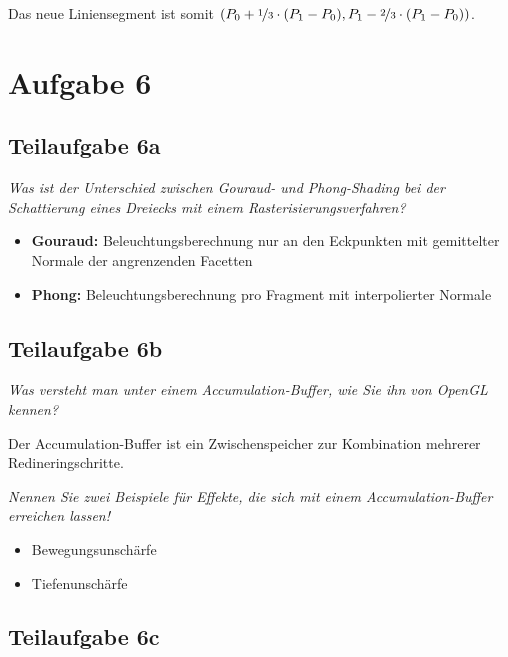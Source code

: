 \documentclass[a4paper]{scrartcl}
\begin{document}
Das neue Liniensegment ist somit $(P_0 + \nicefrac{1}{3} \cdot (P_1- P_0), P_1 - \nicefrac{2}{3} \cdot (P_1- P_0))$.

\section*{Aufgabe 6}
\subsection*{Teilaufgabe 6a}
\textit{Was ist der Unterschied zwischen Gouraud- und Phong-Shading bei der Schattierung eines Dreiecks mit einem Rasterisierungsverfahren?}

\begin{itemize}
	\item \textbf{Gouraud:} Beleuchtungsberechnung nur an den Eckpunkten mit gemittelter Normale der angrenzenden Facetten
	\item \textbf{Phong:} Beleuchtungsberechnung pro Fragment mit interpolierter Normale
\end{itemize}

\subsection*{Teilaufgabe 6b}
\textit{Was versteht man unter einem Accumulation-Buffer, wie Sie ihn von OpenGL kennen?}

Der Accumulation-Buffer ist ein Zwischenspeicher zur Kombination mehrerer
Redineringschritte.

\textit{Nennen Sie zwei Beispiele für Effekte, die sich mit einem Accumulation-Buffer erreichen lassen!}

\begin{itemize}
    \item Bewegungsunschärfe
    \item Tiefenunschärfe
\end{itemize}

\subsection*{Teilaufgabe 6c}
\end{document}
